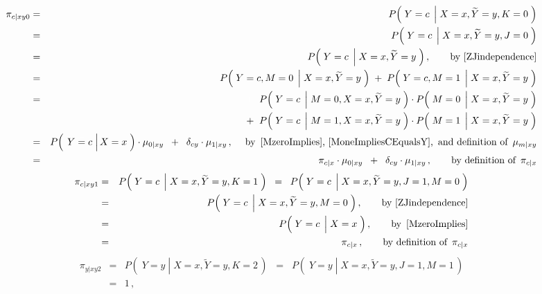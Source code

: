 \begin{enumerate}
\begin{eqnarray*}
\pi_{c \vert xy0}
&=&
	P\!\left(\;Y=c\;\left\vert\;X=x,\widetilde{Y}=y,K=0\right.\,\right)
\\
&=&
	P\!\left(\;Y=c\;\left\vert\;X=x,\widetilde{Y}=y,J=0\right.\,\right)
\\
&=&
	P\!\left(\;Y=c\;\left\vert\;X=x,\widetilde{Y}=y\right.\,\right),
	\quad\quad
	\textnormal{by \eqref{ZJindependence}}
\\
&=&
	P\!\left(\;Y=c,M=0\;\left\vert\;X=x,\widetilde{Y}=y\right.\,\right)
	\;+\;
	P\!\left(\;Y=c,M=1\;\left\vert\;X=x,\widetilde{Y}=y\right.\,\right)
\\
&=&
	{\color{white}+}\;\;
	P\!\left(\;Y=c\;\left\vert\;M=0,X=x,\widetilde{Y}=y\right.\,\right)
	\cdot
	P\!\left(\;M=0\;\left\vert\;X=x,\widetilde{Y}=y\right.\,\right)
\\
&&
	+\;\;
	P\!\left(\;Y=c\;\left\vert\;M=1,X=x,\widetilde{Y}=y\right.\,\right)
	\cdot
	P\!\left(\;M=1\;\left\vert\;X=x,\widetilde{Y}=y\right.\,\right)
\\
&=&
	P\!\left(\;\left.Y\overset{{\color{white}-}}{=}c\;\right\vert X=x\;\right)
	\cdot
	\mu_{0 \vert xy}
	\;\;+\;\;
	\delta_{cy}
	\cdot
	\mu_{1 \vert xy}\,,
	\quad\;
	\textnormal{by \,\eqref{MzeroImplies}, \eqref{MoneImpliesCEqualsY},\, and definition of \,$\mu_{m \vert xy}$}
\\
&=&
	\pi_{c \vert x}
	\cdot
	\mu_{0 \vert xy}
	\;\;+\;\;
	\delta_{cy}
	\cdot
	\mu_{1 \vert xy}\,,
	\quad\quad
	\textnormal{by definition of \,$\pi_{c \vert x}$}
\end{eqnarray*}
\begin{eqnarray*}
\pi_{c \vert xy1}
&=&
	P\!\left(\;Y=c\;\left\vert\;X=x,\widetilde{Y}=y,K=1\right.\,\right)
\;\;=\;\;
	P\!\left(\;Y=c\;\left\vert\;X=x,\widetilde{Y}=y,J=1,M=0\right.\,\right)
\\
&=&
	P\!\left(\;Y=c\;\left\vert\;X=x,\widetilde{Y}=y,M=0\right.\,\right),
	\quad\quad
	\textnormal{by \eqref{ZJindependence}}
\\
&=&
	P\!\left(\;Y=c\;\left\vert\;X\overset{{\color{white}-}}{=}x\right.\,\right),
	\quad\quad
	\textnormal{by \,\eqref{MzeroImplies}}
\\
&=&
	\pi_{c \vert x}\,,
	\quad\quad
	\textnormal{by definition of \,$\pi_{c \vert x}$}
\end{eqnarray*}
\begin{eqnarray*}
\pi_{y \vert xy2}
&=&
	P\!\left(\;Y=y\;\left\vert\;X=x,\widetilde{Y}=y,K=2\right.\,\right)
\;\;=\;\;
	P\!\left(\;Y=y\;\left\vert\;X=x,\widetilde{Y}=y,J=1,M=1\right.\,\right)
\\
&=&
	1\,,
	\quad\quad

\end{eqnarray*}
\end{enumerate}
